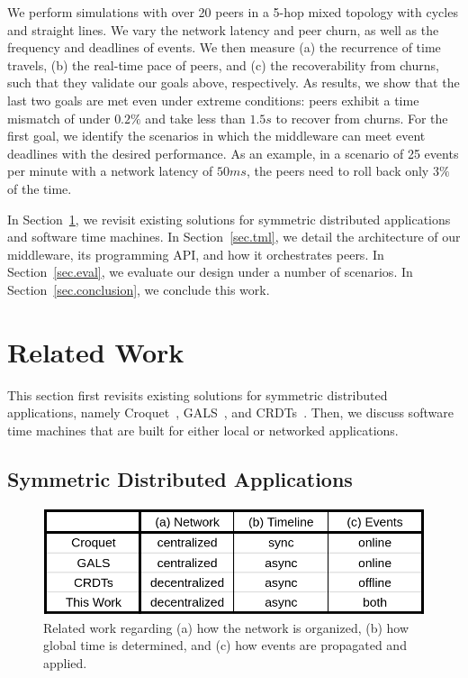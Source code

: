 \documentclass[fleqn,10pt]{SelfArx}
\begin{document}
We perform simulations with over 20 peers in a 5-hop mixed topology with cycles
and straight lines.
We vary the network latency and peer churn, as well as the frequency and
deadlines of events.
%
We then measure (a) the recurrence of time travels, (b) the real-time pace of
peers, and (c) the recoverability from churns, such that they validate our
goals above, respectively.
%
As results, we show that the last two goals are met even under extreme
conditions: peers exhibit a time mismatch of under $0.2\%$ and take less than
$1.5s$ to recover from churns.
%
For the first goal, we identify the scenarios in which the middleware can meet
event deadlines with the desired performance.
As an example, in a scenario of 25 events per minute with a network latency of
$50ms$, the peers need to roll back only $3\%$ of the time.

In Section~\ref{sec.related}, we revisit existing solutions for symmetric
distributed applications and software time machines.
In Section~\ref{sec.tml}, we detail the architecture of our middleware, its
programming API, and how it orchestrates peers.
In Section~\ref{sec.eval}, we evaluate our design under a number of scenarios.
In Section~\ref{sec.conclusion}, we conclude this work.

\section{Related Work}
\label{sec.related}

This section first revisits existing solutions for symmetric distributed
applications, namely Croquet~\cite{croquet,croquet.new}, GALS~\cite{gals}, and
CRDTs~\cite{crdts}.
Then, we discuss software time machines that are built for either local or
networked applications.

\subsection{Symmetric Distributed Applications}
\label{sec.related.sym}

\begin{figure}
  \centering
  \includegraphics[width=\linewidth]{table}
  \caption{
    Related work regarding
        (a) how the network is organized,
        (b) how global time is determined, and
        (c) how events are propagated and applied.
    \label{fig.table}
  }
\end{figure}
\end{document}

